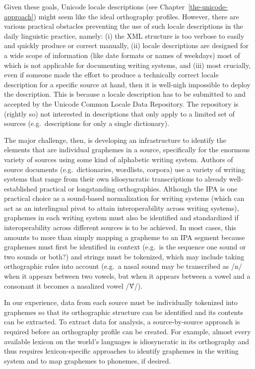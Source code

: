 Given these goals, Unicode locale descriptions (see
Chapter~\ref{the-unicode-approach}) might seem like the ideal orthography
profiles. However, there are various practical obstacles preventing the use of
such locale descriptions in the daily linguistic practice, namely: (i) the
XML structure is too verbose to easily and quickly produce or correct manually,
(ii) locale descriptions are designed for a wide scope of information (like date
formats or names of weekdays) most of which is not applicable for documenting
writing systems, and (iii) most crucially, even if someone made the effort to
produce a technically correct locale description for a specific source at hand,
then it is well-nigh impossible to deploy the description. This is because a locale
description has to be submitted to and accepted by the Unicode Common Locale
Data Repository. The repository is (rightly so) not interested in descriptions
that only apply to a limited set of sources (e.g.~descriptions for only a single
dictionary).

The major challenge, then, is developing an infrastructure to identify the
elements that are individual graphemes in a source, specifically for the
enormous variety of sources using some kind of alphabetic writing system.
Authors of source documents (e.g.~dictionaries, wordlists, corpora) use a
variety of writing systems that range from their own idiosyncratic
transcriptions to already well-established practical or longstanding
orthographies. Although the IPA is one practical choice as a sound-based
normalization for writing systems (which can act as an interlingual pivot to
attain interoperability across writing systems), graphemes in each writing
system must also be identified and standardized if interoperability across
different sources is to be achieved. In most cases, this amounts to more than
simply mapping a grapheme to an IPA segment because graphemes must first be
identified in context (e.g.~is the sequence one sound or two sounds or both?)
and strings must be tokenized, which may include taking orthographic rules into
account (e.g.~a nasal sound may be transcribed as /n/ when it appears between 
two vowels, but when it appears between a vowel and a consonant it becomes 
a nasalized vowel /Ṽ/).

In our experience, data from each source must be
individually tokenized into graphemes so that its orthographic structure can be 
identified and its contents can be extracted. To extract data for analysis, a
source-by-source approach is required before an orthography profile can be
created. For example, almost every available lexicon on the world's languages is
idiosyncratic in its orthography and thus requires lexicon-specific approaches
to identify graphemes in the writing system and to map graphemes to phonemes, if
desired.

